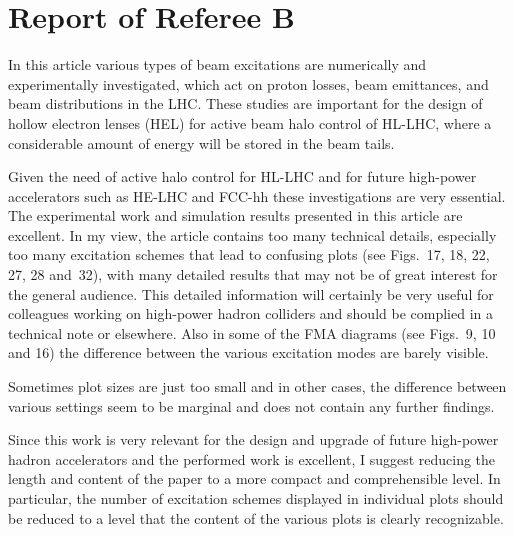 \documentclass[aps
,prstab
,preprint,tightenlines
,amsfonts,amssymb,amsmath
]{revtex4-1}
\newenvironment{co}{\em}{}
\newcommand{\bco}{\begin{co}}
\newcommand{\eco}{\end{co}}
\begin{document}
\section*{Report of Referee B}

\bco

  In this article various types of beam excitations are numerically
  and experimentally investigated, which act on proton losses, beam
  emittances, and beam distributions in the LHC. These studies are
  important for the design of hollow electron lenses (HEL) for active
  beam halo control of HL-LHC, where a considerable amount of energy
  will be stored in the beam tails.

  Given the need of active halo control for HL-LHC and for future
  high-power accelerators such as HE-LHC and FCC-hh these
  investigations are very essential. The experimental work and
  simulation results presented in this article are excellent. In my
  view, the article contains too many technical details, especially
  too many excitation schemes that lead to confusing plots (see
  Figs.~17, 18, 22, 27, 28 and~32), with many detailed results that
  may not be of great interest for the general audience. This detailed
  information will certainly be very useful for colleagues working on
  high-power hadron colliders and should be complied in a technical
  note or elsewhere. Also in some of the FMA diagrams (see Figs.~9, 10
  and 16) the difference between the various excitation modes are
  barely visible.

  Sometimes plot sizes are just too small and in other cases, the
  difference between various settings seem to be marginal and does not
  contain any further findings.

  Since this work is very relevant for the design and upgrade of
  future high-power hadron accelerators and the performed work is
  excellent, I suggest reducing the length and content of the paper to
  a more compact and comprehensible level. In particular, the number
  of excitation schemes displayed in individual plots should be
  reduced to a level that the content of the various plots is clearly
  recognizable.
\eco
\end{document}
